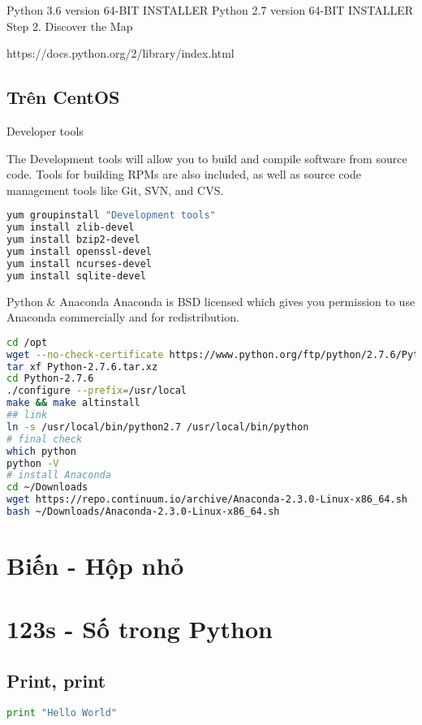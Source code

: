 Python 3.6 version
64-BIT INSTALLER
Python 2.7 version
64-BIT INSTALLER
Step 2. Discover the Map

https://docs.python.org/2/library/index.html

\subsection{Trên CentOS}

Developer tools

The Development tools will allow you to build and compile software from source code. Tools for building RPMs are also included, as well as source code management tools like Git, SVN, and CVS.

\begin{lstlisting}[language=bash]
yum groupinstall "Development tools"
yum install zlib-devel
yum install bzip2-devel
yum install openssl-devel
yum install ncurses-devel
yum install sqlite-devel
\end{lstlisting}

Python & Anaconda
Anaconda is BSD licensed which gives you permission to use Anaconda commercially and for redistribution.

\begin{lstlisting}[language=bash]
cd /opt
wget --no-check-certificate https://www.python.org/ftp/python/2.7.6/Python-2.7.6.tar.xz
tar xf Python-2.7.6.tar.xz
cd Python-2.7.6
./configure --prefix=/usr/local
make && make altinstall
## link
ln -s /usr/local/bin/python2.7 /usr/local/bin/python
# final check
which python
python -V
# install Anaconda
cd ~/Downloads
wget https://repo.continuum.io/archive/Anaconda-2.3.0-Linux-x86_64.sh
bash ~/Downloads/Anaconda-2.3.0-Linux-x86_64.sh
\end{lstlisting}

\section{Biến - Hộp nhỏ}

\section{123s - Số trong Python}

\subsection{Print, print}

\begin{lstlisting}[language=python]
print "Hello World"
\end{lstlisting}

